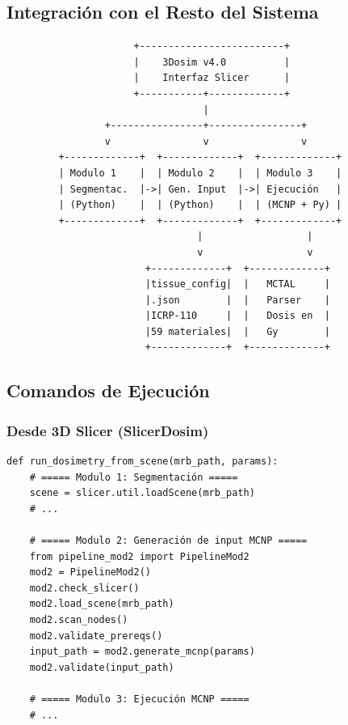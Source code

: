 \documentclass[12pt,a4paper]{article}
\begin{document}
\subsection{Integración con el Resto del Sistema}

\begin{lstlisting}
                      +-------------------------+
                      |    3Dosim v4.0          |
                      |    Interfaz Slicer      |
                      +-----------+-------------+
                                  |
                 +----------------+----------------+
                 v                v                v
         +-------------+  +-------------+  +-------------+
         | Modulo 1    |  | Modulo 2    |  | Modulo 3    |
         | Segmentac.  |->| Gen. Input  |->| Ejecución   |
         | (Python)    |  | (Python)    |  | (MCNP + Py) |
         +-------------+  +-------------+  +-------------+
                                 |                  |
                                 v                  v
                        +-------------+  +-------------+
                        |tissue_config|  |   MCTAL     |
                        |.json        |  |   Parser    |
                        |ICRP-110     |  |   Dosis en  |
                        |59 materiales|  |   Gy        |
                        +-------------+  +-------------+
\end{lstlisting}

\subsection{Comandos de Ejecución}

\subsubsection{Desde 3D Slicer (SlicerDosim)}

\begin{lstlisting}
def run_dosimetry_from_scene(mrb_path, params):
    # ===== Modulo 1: Segmentación =====
    scene = slicer.util.loadScene(mrb_path)
    # ...

    # ===== Modulo 2: Generación de input MCNP =====
    from pipeline_mod2 import PipelineMod2
    mod2 = PipelineMod2()
    mod2.check_slicer()
    mod2.load_scene(mrb_path)
    mod2.scan_nodes()
    mod2.validate_prereqs()
    input_path = mod2.generate_mcnp(params)
    mod2.validate(input_path)

    # ===== Modulo 3: Ejecución MCNP =====
    # ...
\end{lstlisting}
\end{document}
